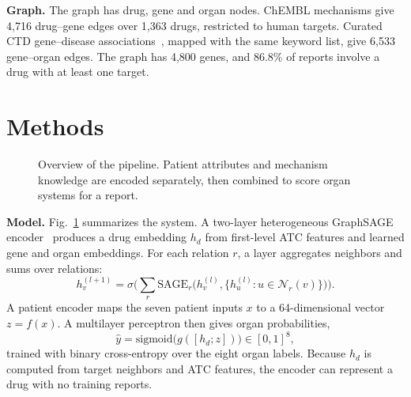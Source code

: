 \documentclass[conference,a4paper]{IEEEtran}
\begin{document}
\textbf{Graph.} The graph has drug, gene and organ nodes. ChEMBL mechanisms give 4,716 drug--gene edges over 1,363 drugs, restricted to human targets. Curated CTD gene--disease associations~\cite{davis2023}, mapped with the same keyword list, give 6,533 gene--organ edges. The graph has 4,800 genes, and 86.8\% of reports involve a drug with at least one target.

\section{Methods}
\begin{figure}[t]
\centering
{}
\caption{Overview of the pipeline. Patient attributes and mechanism knowledge are encoded separately, then combined to score organ systems for a report.}
\label{fig:pipe}
\end{figure}

\textbf{Model.} Fig.~\ref{fig:pipe} summarizes the system. A two-layer heterogeneous GraphSAGE encoder~\cite{hamilton2017} produces a drug embedding $h_d$ from first-level ATC features and learned gene and organ embeddings. For each relation $r$, a layer aggregates neighbors and sums over relations:
\begin{equation}
h_v^{(l+1)} = \sigma\Big(\sum_{r} \mathrm{SAGE}_r\big(h_v^{(l)}, \{h_u^{(l)} : u \in \mathcal{N}_r(v)\}\big)\Big).
\end{equation}
A patient encoder maps the seven patient inputs $x$ to a 64-dimensional vector $z=f(x)$. A multilayer perceptron then gives organ probabilities,
\begin{equation}
\hat{y} = \mathrm{sigmoid}\big(g([h_d; z])\big) \in [0,1]^8,
\end{equation}
trained with binary cross-entropy over the eight organ labels. Because $h_d$ is computed from target neighbors and ATC features, the encoder can represent a drug with no training reports.
\end{document}
